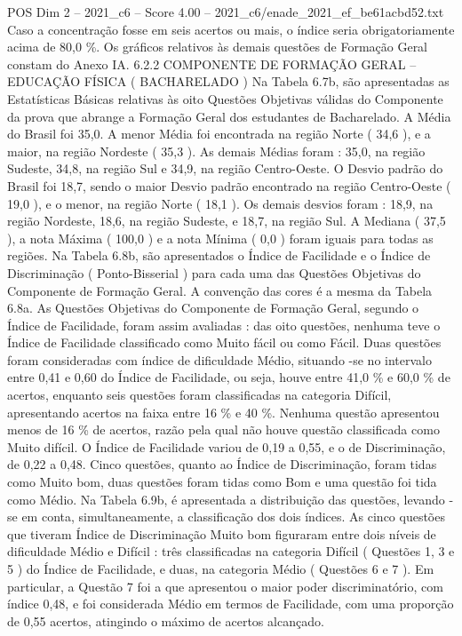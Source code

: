 \begin{textsample}{POS Dim 2 – 2021\_c6 – Score 4.00 – 2021\_c6/enade\_2021\_ef\_be61acbd52.txt}
Caso a concentração fosse em seis acertos ou mais, o índice seria obrigatoriamente acima de 80,0 \%.
Os gráficos relativos às demais questões de Formação Geral constam do Anexo IA. 6.2.2 COMPONENTE DE FORMAÇÃO GERAL – EDUCAÇÃO FÍSICA ( BACHARELADO ) Na Tabela 6.7b, são apresentadas as Estatísticas Básicas relativas às oito Questões Objetivas válidas do Componente da prova que abrange a Formação Geral dos estudantes de Bacharelado.
A Média do Brasil foi 35,0.
A menor Média foi encontrada na região Norte ( 34,6 ), e a maior, na região Nordeste ( 35,3 ).
As demais Médias foram : 35,0, na região Sudeste, 34,8, na região Sul e 34,9, na região Centro-Oeste.
O Desvio padrão do Brasil foi 18,7, sendo o maior Desvio padrão encontrado na região Centro-Oeste ( 19,0 ), e o menor, na região Norte ( 18,1 ).
Os demais desvios foram : 18,9, na região Nordeste, 18,6, na região Sudeste, e 18,7, na região Sul.
A Mediana ( 37,5 ), a nota Máxima ( 100,0 ) e a nota Mínima ( 0,0 ) foram iguais para todas as regiões.
Na Tabela 6.8b, são apresentados o Índice de Facilidade e o Índice de Discriminação ( Ponto-Bisserial ) para cada uma das Questões Objetivas do Componente de Formação Geral.
A convenção das cores é a mesma da Tabela 6.8a.
As Questões Objetivas do Componente de Formação Geral, segundo o Índice de Facilidade, foram assim avaliadas : das oito questões, nenhuma teve o Índice de Facilidade classificado como Muito fácil ou como Fácil.
Duas questões foram consideradas com índice de dificuldade Médio, situando -se no intervalo entre 0,41 e 0,60 do Índice de Facilidade, ou seja, houve entre 41,0 \% e 60,0 \% de acertos, enquanto seis questões foram classificadas na categoria Difícil, apresentando acertos na faixa entre 16 \% e 40 \%.
Nenhuma questão apresentou menos de 16 \% de acertos, razão pela qual não houve questão classificada como Muito difícil.
O Índice de Facilidade variou de 0,19 a 0,55, e o de Discriminação, de 0,22 a 0,48.
Cinco questões, quanto ao Índice de Discriminação, foram tidas como Muito bom, duas questões foram tidas como Bom e uma questão foi tida como Médio.
Na Tabela 6.9b, é apresentada a distribuição das questões, levando -se em conta, simultaneamente, a classificação dos dois índices.
As cinco questões que tiveram Índice de Discriminação Muito bom figuraram entre dois níveis de dificuldade Médio e Difícil : três classificadas na categoria Difícil ( Questões 1, 3 e 5 ) do Índice de Facilidade, e duas, na categoria Médio ( Questões 6 e 7 ).
Em particular, a Questão 7 foi a que apresentou o maior poder discriminatório, com índice 0,48, e foi considerada Médio em termos de Facilidade, com uma proporção de 0,55 acertos, atingindo o máximo de acertos alcançado.

\end{textsample}
